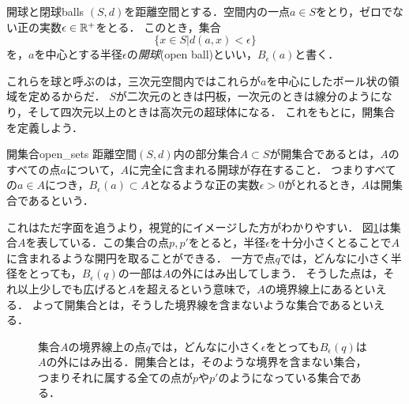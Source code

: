\documentclass[11pt,a4paper, dvipdfmx]{jsarticle}
\begin{document}
\begin{dfn}{開球と閉球}{balls}
 $(S, d)$を距離空間とする．空間内の一点$a \in S$をとり，ゼロでない正の実数$\epsilon \in \mathbb{R}^+$をとる．
このとき，集合
\[
  \{ x \in S | d(a, x) < \epsilon \}
\]
を，$a$を中心とする半径$\epsilon$の\emph{開球}(open ball)といい，$B_\epsilon(a)$と書く．%
\end{dfn}
これらを球と呼ぶのは，三次元空間内ではこれらが$a$を中心にしたボール状の領域を定めるからだ．
$S$が二次元のときは円板，一次元のときは線分のようになり，そして四次元以上のときは高次元の超球体になる．
これをもとに，開集合を定義しよう．

\begin{dfn}{開集合}{open_sets}
距離空間$(S, d)$内の部分集合$A \subset S$が開集合であるとは，$A$のすべての点$a$について，$A$に完全に含まれる開球が存在すること．
つまりすべての$a \in A$につき，$B_\epsilon(a) \subset A$となるような正の実数$\epsilon>0$がとれるとき，$A$は開集合であるという．
\end{dfn}
これはただ字面を追うより，視覚的にイメージした方がわかりやすい．
図\ref{fig:openset}は集合$A$を表している．この集合の点$p, p'$をとると，半径$\epsilon$を十分小さくとることで$A$に含まれるような開円を取ることができる．
一方で点$q$では，どんなに小さく半径をとっても，$B_\epsilon(q)$の一部は$A$の外にはみ出してしまう．
そうした点は，それ以上少しでも広げると$A$を超えるという意味で，$A$の境界線上にあるといえる．
よって開集合とは，そうした境界線を含まないような集合であるといえる．

\begin{figure}[htbp]
 \begin{center}
 \end{center}
 \caption{集合$A$の境界線上の点$q$では，どんなに小さく$\epsilon$をとっても$B_\epsilon(q)$は$A$の外にはみ出る．開集合とは，そのような境界を含まない集合，つまりそれに属する全ての点が$p$や$p'$のようになっている集合である．}
 \label{fig:openset}
\end{figure}
\end{document}
